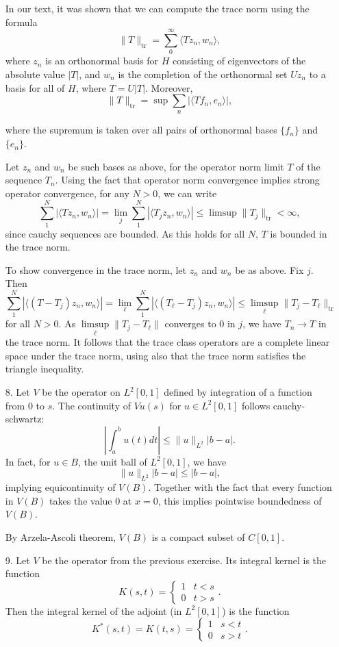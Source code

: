 \documentclass[11pt, reqno]{article}
\theoremstyle{plain}
\theoremstyle{definition}
\theoremstyle{remark}
\begin{document}
\begin{enumerate}
    In our text, it was shown that we can compute the trace norm using the formula 
    \[
        \|T\|_{\text{tr}} = \sum_0^\infty \langle T z_n, w_n\rangle,
    \]
    where $z_n$ is an orthonormal basis for $H$ consisting of eigenvectors of the absolute value $|T|$,
    and $w_n$ is the completion of the orthonormal set $U z_n$ to a basis for all of $H$, where $T = U|T|$.
    Moreover, 
    \[
        \|T\|_{\text{tr}} = \sup \sum_n |\langle T f_n, e_n\rangle|,
    \]

    where the supremum is taken over all pairs of orthonormal bases $\{f_n\}$ and $\{e_n\}$.

    Let $z_n$ and $w_n$ be such bases as above, for the operator norm limit $T$ of the sequence $T_n$. Using the fact
    that operator norm convergence implies strong operator convergence, for any $N > 0$, we can write
    \[
        \sum_1^N |\langle T z_n, w_n\rangle| = \lim_j \sum_1^N |\langle T_j z_n, w_n\rangle|
        \leq \limsup \|T_j\|_{\text{tr}} < \infty,
    \]
    since cauchy sequences are bounded. As this holds for all $N$, $T$ is bounded in the trace norm. 

    To show convergence in the trace norm, let $z_n$ and $w_n$ be as above. Fix $j$. Then 
    \[
        \sum_1^N|\langle (T - T_j) z_n, w_n\rangle|  = \lim_\ell \sum_1^N |\langle(T_\ell - T_j)z_n, w_n\rangle|
        \leq \limsup_\ell \|T_j - T_\ell\|_{\text{tr}}
    \]
    for all $N > 0$. As $\limsup\limits_\ell \|T_j - T_\ell\|$ converges to $0$ in $j$, we have $T_n \to T$ in the 
    trace norm. It follows that the trace class operators are a complete linear space under the trace norm,
    using also that the trace norm satisfies the triangle inequality.

    \item[8.] Let $V$ be the operator on $L^2[0,1]$ defined by integration of a function from $0$ to $s$. 
    The continuity of $Vu(s)$ for $u \in L^2[0,1]$ follows cauchy-schwartz:
    \[
        \left|\int_a^b u(t)dt\right| \leq \|u\|_{L^2}|b - a|.
    \]
    In fact, for $u \in B$, the unit ball of $L^2[0,1]$, we have 
    \[
        \|u\|_{L^2}|b-a| \leq |b-a|,
    \]
    implying equicontinuity of $V(B)$. Together with the fact that every function in $V(B)$ takes 
    the value $0$ at $x = 0$, this implies pointwise boundedness of $V(B)$. 

    By Arzela-Ascoli theorem, $V(B)$ is a compact subset of $C[0,1]$.
    
    \item[9.] Let $V$ be the operator from the previous exercise. Its integral kernel 
    is the function
    \[
        K(s,t) = \begin{cases}
        1 & t < s\\
        0 & t > s
        \end{cases}.
    \]
    Then the integral kernel of the adjoint (in $L^2[0,1]$) is the function
    \[
        K^*(s,t) = K(t,s) = \begin{cases}
            1 & s < t\\
            0 & s > t
        \end{cases}.
    \]


\end{enumerate}
\end{document}
